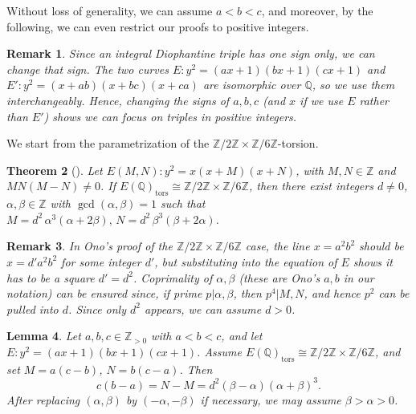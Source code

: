 \documentclass{article}
\theoremstyle{plain}
\newtheorem{theorem}{Theorem}
\newtheorem{lemma}[theorem]{Lemma}
\newtheorem{remark}[theorem]{Remark}
\newcommand{\Z}{\mathbb{Z}}
\newcommand{\Q}{\mathbb{Q}}
\newcommand{\tors}{\mathrm{tors}}
\begin{document}
Without loss of generality, we can assume \(a < b < c\), and moreover, by the following, we can even restrict our proofs to positive integers.

\begin{remark}
    Since an integral Diophantine triple has one sign only, we can change that sign. The two curves $E: y^2=(ax+1)(bx+1)(cx+1)$ and $E': y^2=(x+ab)(x+bc)(x+ca)$ are isomorphic over $\Q$, so we use them interchangeably. Hence, changing the signs of $a,b,c$ (and $x$ if we use $E$ rather than $E'$) shows we can focus on triples in positive integers.
\end{remark}

We start from the parametrization of the \( \Z/2\Z\times\Z/6\Z \)-torsion.

\begin{theorem}[{}]\label{thm:OnoCorrected}
Let \( E(M,N): y^2=x(x+M)(x+N)\), with \(M,N\in \Z\) and \(MN(M-N)\neq 0\).
If \( E(\Q)_{\tors}\cong \Z/2\Z\times \Z/6\Z\), then there exist integers \(d\neq 0\), \(\alpha,\beta\in \Z\) with
\(\gcd(\alpha,\beta)=1\) such that
\( M=d^2\,\alpha^3(\alpha+2\beta),\, N=d^2\,\beta^3(\beta+2\alpha) \).
\end{theorem}

\begin{remark}
In Ono's proof of the \( \Z/2\Z\times \Z/6\Z \) case, the line
\(x=a^2b^2\) should be \(x=d'a^2b^2\) for some integer \(d'\), but substituting into the equation of $E$ shows it has to be a square $d'=d^2$. Coprimality of \( \alpha, \beta\)  (these are Ono's \(a, b\) in our notation) can be ensured since, if prime $p|\alpha, \beta$, then $p^4|M, N$, and hence $p^2$ can be pulled into $d$.
Since only \(d^2\) appears, we can assume \(d > 0\).

\end{remark}

\begin{lemma}\label{lem:bezRegularnosti}
Let \(a,b,c\in \Z_{>0}\) with \(a<b<c\), and let \(E: y^2=(ax+1)(bx+1)(cx+1)\).
Assume \(E(\Q)_{\tors}\cong \Z/2\Z\times \Z/6\Z\), and set
\(M=a(c-b)\), \(N=b(c-a)\). Then
\[
c(b-a)=N-M=d^2(\beta-\alpha)(\alpha+\beta)^3.
\]
After replacing \((\alpha,\beta)\) by \((-\alpha,-\beta)\) if necessary, we may assume \(\beta>\alpha > 0\).
\end{lemma}
\end{document}
